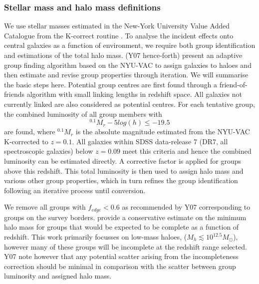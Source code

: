 \subsubsection{Stellar mass and halo mass definitions} \label{sec:mass_hab}
We use stellar masses estimated in the New-York University Value Added Catalogue from the K-correct routine \citep[NYU-VAC;][]{blanton2005}. To analyse the incident effects onto central galaxies as a function of environment, we require both group identification and estimations of the total halo mass. \citet{yang2007} (Y07 hence-forth) present an adaptive group finding algorithm based on the NYU-VAC to assign galaxies to haloes and then estimate and revise group properties through iteration. We will summarise the basic steps here. Potential group centres are first found through a friend-of-friends algorithm with small linking lengths in redshift space. All galaxies not currently linked are also considered as potential centres. For each tentative group, the combined luminosity of all group members with 
\begin{equation}
^{0.1}M_r - 5log(h) \leq -19.5
\end{equation}
are found, where $^{0.1}M_r$ is the absolute magnitude estimated from the NYU-VAC K-corrected to $z=0.1$. All galaxies within SDSS data-release 7 (DR7, all spectroscopic galaxies) below $z=0.09$ meet this criteria and hence the combined luminosity can be estimated directly. A corrective factor is applied for groups above this redshift. This total luminosity is then used to assign halo mass and various other group properties, which in turn refines the group identification following an iterative process until conversion. 

We remove all groups with $f_{edge} < 0.6$ as recommended by Y07 corresponding to groups on the survey borders. \citet{yang2009} provide a conservative estimate on the minimum halo mass for groups that would be expected to be complete as a function of redshift. This work primarily focusses on low-mass haloes, ($M_h \lesssim 10^{12.5} M_{\odot}$), however many of these groups will be incomplete at the redshift range selected. Y07 note however that any potential scatter arising from the incompleteness correction should be minimal in comparison with the scatter between group luminosity and assigned halo mass. 

